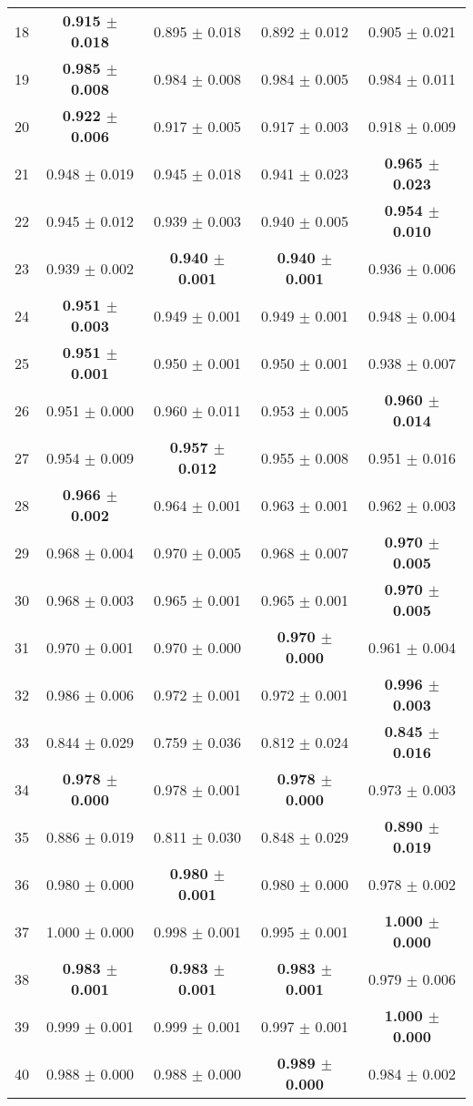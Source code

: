 \begin{table}[!ht]
{\begin{tabular}{r c c c c}
18 & \textbf{0.915 $\pm$ 0.018} & 0.895 $\pm$ 0.018 & 0.892 $\pm$ 0.012 & 0.905 $\pm$ 0.021 \\
19 & \textbf{0.985 $\pm$ 0.008} & 0.984 $\pm$ 0.008 & 0.984 $\pm$ 0.005 & 0.984 $\pm$ 0.011 \\
20 & \textbf{0.922 $\pm$ 0.006} & 0.917 $\pm$ 0.005 & 0.917 $\pm$ 0.003 & 0.918 $\pm$ 0.009 \\
21 & 0.948 $\pm$ 0.019 & 0.945 $\pm$ 0.018 & 0.941 $\pm$ 0.023 & \textbf{0.965 $\pm$ 0.023} \\
22 & 0.945 $\pm$ 0.012 & 0.939 $\pm$ 0.003 & 0.940 $\pm$ 0.005 & \textbf{0.954 $\pm$ 0.010} \\
23 & 0.939 $\pm$ 0.002 & \textbf{0.940 $\pm$ 0.001} & \textbf{0.940 $\pm$ 0.001} & 0.936 $\pm$ 0.006 \\
24 & \textbf{0.951 $\pm$ 0.003} & 0.949 $\pm$ 0.001 & 0.949 $\pm$ 0.001 & 0.948 $\pm$ 0.004 \\
25 & \textbf{0.951 $\pm$ 0.001} & 0.950 $\pm$ 0.001 & 0.950 $\pm$ 0.001 & 0.938 $\pm$ 0.007 \\
26 & 0.951 $\pm$ 0.000 & 0.960 $\pm$ 0.011 & 0.953 $\pm$ 0.005 & \textbf{0.960 $\pm$ 0.014} \\
27 & 0.954 $\pm$ 0.009 & \textbf{0.957 $\pm$ 0.012} & 0.955 $\pm$ 0.008 & 0.951 $\pm$ 0.016 \\
28 & \textbf{0.966 $\pm$ 0.002} & 0.964 $\pm$ 0.001 & 0.963 $\pm$ 0.001 & 0.962 $\pm$ 0.003 \\
29 & 0.968 $\pm$ 0.004 & 0.970 $\pm$ 0.005 & 0.968 $\pm$ 0.007 & \textbf{0.970 $\pm$ 0.005} \\
30 & 0.968 $\pm$ 0.003 & 0.965 $\pm$ 0.001 & 0.965 $\pm$ 0.001 & \textbf{0.970 $\pm$ 0.005} \\
31 & 0.970 $\pm$ 0.001 & 0.970 $\pm$ 0.000 & \textbf{0.970 $\pm$ 0.000} & 0.961 $\pm$ 0.004 \\
32 & 0.986 $\pm$ 0.006 & 0.972 $\pm$ 0.001 & 0.972 $\pm$ 0.001 & \textbf{0.996 $\pm$ 0.003} \\
33 & 0.844 $\pm$ 0.029 & 0.759 $\pm$ 0.036 & 0.812 $\pm$ 0.024 & \textbf{0.845 $\pm$ 0.016} \\
34 & \textbf{0.978 $\pm$ 0.000} & 0.978 $\pm$ 0.001 & \textbf{0.978 $\pm$ 0.000} & 0.973 $\pm$ 0.003 \\
35 & 0.886 $\pm$ 0.019 & 0.811 $\pm$ 0.030 & 0.848 $\pm$ 0.029 & \textbf{0.890 $\pm$ 0.019} \\
36 & 0.980 $\pm$ 0.000 & \textbf{0.980 $\pm$ 0.001} & 0.980 $\pm$ 0.000 & 0.978 $\pm$ 0.002 \\
37 & 1.000 $\pm$ 0.000 & 0.998 $\pm$ 0.001 & 0.995 $\pm$ 0.001 & \textbf{1.000 $\pm$ 0.000} \\
38 & \textbf{0.983 $\pm$ 0.001} & \textbf{0.983 $\pm$ 0.001} & \textbf{0.983 $\pm$ 0.001} & 0.979 $\pm$ 0.006 \\
39 & 0.999 $\pm$ 0.001 & 0.999 $\pm$ 0.001 & 0.997 $\pm$ 0.001 & \textbf{1.000 $\pm$ 0.000} \\
40 & 0.988 $\pm$ 0.000 & 0.988 $\pm$ 0.000 & \textbf{0.989 $\pm$ 0.000} & 0.984 $\pm$ 0.002 \\
\end{tabular}}
\end{table}
